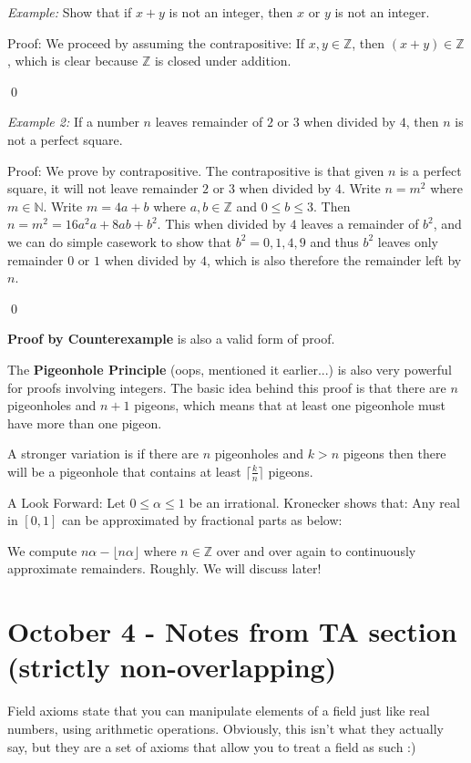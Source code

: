 \documentclass{report}
\begin{document}
\emph{Example:} Show that if $x+y$ is not an integer, then $x$ or $y$ is not an integer. 

Proof: We proceed by assuming the contrapositive: If $x,y \in \mathbb{Z}$, then $(x+y) \in \mathbb{Z}$, which is clear because $\mathbb{Z}$ is closed under addition.

\qed

\emph{Example 2:} If a number $n$ leaves remainder of $2$ or $3$ when divided by $4$, then $n$ is not a perfect square.

Proof: We prove by contrapositive. The contrapositive is that given $n$ is a perfect square, it will not leave remainder $2$ or $3$ when divided by $4$. Write $n = m^2$ where $m \in \mathbb{N}$. Write $m = 4a + b$ where $a,b \in \mathbb{Z}$ and $0 \leq b \leq 3$. Then $n = m^2 = 16 a^2 a + 8ab + b^2$. This when divided by $4$ leaves a remainder of $b^2$, and we can do simple casework to show that $b^2 = 0, 1, 4, 9$ and thus $b^2$ leaves only remainder $0$ or $1$ when divided by $4$, which is also therefore the remainder left by $n$.

\qed

\textbf{Proof by Counterexample} is also a valid form of proof.

The \textbf{Pigeonhole Principle} (oops, mentioned it earlier...) is also very powerful for proofs involving integers. The basic idea behind this proof is that there are $n$ pigeonholes and $n+1$ pigeons, which means that at least one pigeonhole must have more than one pigeon. 

A stronger variation is if there are $n$ pigeonholes and $k > n$ pigeons then there will be a pigeonhole that contains at least $\lceil \frac{k}{n} \rceil$ pigeons.

A Look Forward: Let $0 \leq \alpha \leq 1$ be an irrational. Kronecker shows that: Any real in $[0,1]$ can be approximated by fractional parts as below:

We compute $n \alpha - \lfloor n \alpha \rfloor$ where $n \in \mathbb{Z}$ over and over again to continuously approximate remainders. Roughly. We will discuss later!

\chapter{October 4 - Notes from TA section (strictly non-overlapping)}

Field axioms state that you can manipulate elements of a field just like real numbers, using arithmetic operations. Obviously, this isn't what they actually say, but they are a set of axioms that allow you to treat a field as such :)
\end{document}
